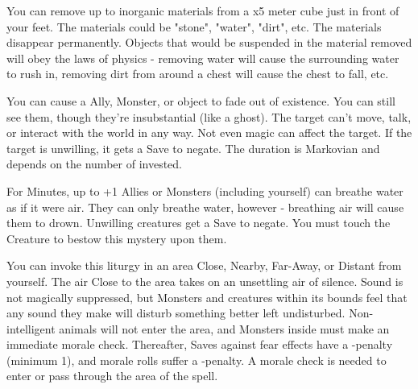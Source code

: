 {\MYSTERY [
  Name = Excavate,
  Link = arcana-mystery-excavate,
  Paradigm = Elements,
  Save = N,
  Duration = Instant,
  Target = Close
]

You can remove up to \DICE inorganic materials from a \DICE x5 meter cube just in front of your feet.  The materials could be "stone", "water", "dirt", etc. The materials disappear permanently. Objects that would be suspended in the material removed will obey the laws of physics - removing water will cause the surrounding water to rush in, removing dirt from around a chest will cause the chest to fall, etc.

\MYSTERY [
  Name = Fade,
  Link = arcana-mystery-fade,
  Paradigm = Mind,
  Save = Y (neg.),
  Duration = Markovian,
  Target = Nearby Target(s)
]

You can cause a Ally, Monster, or object to fade out of existence.  You can still see them, though they're insubstantial (like a ghost).  The target can't move, talk, or interact with the world in any way.  Not even magic can affect the target.  If the target is unwilling, it gets a Save to negate.  The duration is Markovian and depends on the number of \DICE invested.

\MYSTERY [
  Name = Mermaid's Breath,
  Link = arcana-mystery-mermaids-breath,
  Paradigm = Biomancy,
  Save = Y (neg.),
  Duration = \SUM Minutes,
  Target = Self or Close Target(s)
]

For \SUMDICE Minutes, up to \DICE+1 Allies or Monsters (including yourself) can breathe water as if it were air.  They can only breathe water, however - breathing air will cause them to drown. Unwilling creatures get a Save to negate.  You must touch the Creature to bestow this mystery upon them. 

\MYSTERY [
  Name = Sinister Stillness,
  Link = arcana-mystery-sinister-stillness,
  Paradigm = Mind,
  Save = N,
  Duration = Combat or \SUM Minutes,
  Target = Close\, Nearby\, Far-Away\, or Distant
]

You can invoke this liturgy in an area  Close, Nearby, Far-Away, or Distant from yourself.  The air Close to the area takes on an unsettling air of silence.  Sound is not magically suppressed, but Monsters and creatures within its bounds feel that any sound they make will disturb something better left undisturbed.  Non-intelligent animals will not enter the area, and Monsters inside must make an immediate morale check. Thereafter, Saves against fear effects have a -\DICE penalty (minimum 1), and morale rolls suffer a -\DICE penalty.  A morale check is needed to enter or pass through the area of the spell.

}

